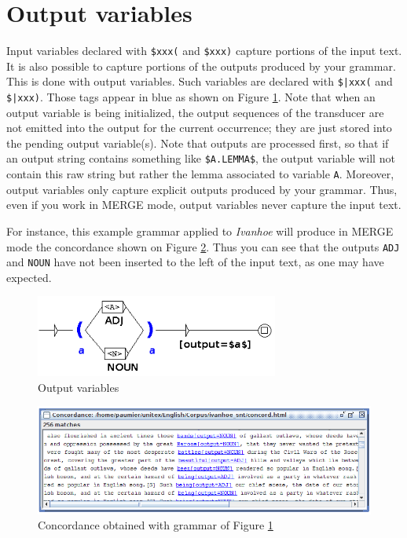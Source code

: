 \clearpage




\section{Output variables}
\label{section-output-variables}
Input variables declared with \verb+$xxx(+ and \verb+$xxx)+ capture portions of the input text. It
is also possible to capture portions of the outputs produced by your grammar. This is done with output variables.
Such variables are declared with \verb+$|xxx(+ and \verb+$|xxx)+. Those tags appear in blue as shown 
on Figure \ref{fig-output-variables}. Note that when an output variable is being initialized, the output sequences
of the transducer
are not emitted into the output for the current occurrence; they are just stored into the pending output variable(s).
Note that outputs are processed first, so that if an output string contains something like \verb+$A.LEMMA$+,
the output variable will not contain this raw string but rather the lemma associated to variable \verb+A+.
Moreover, output variables only capture explicit outputs produced by your grammar. Thus, even if you work
in MERGE mode, output variables never capture the input text. 

\noindent For instance, this example grammar applied to \textit{Ivanhoe} will produce in MERGE mode the concordance 
shown on Figure \ref{fig-output-variables-concord}. Thus you can see that the outputs \verb+ADJ+ and 
\verb+NOUN+ have not been inserted to the left of the input text, as one may have expected.

\begin{figure}[!ht]
\begin{center}
\includegraphics[width=8cm]{resources/img/fig6-17r.png}
\caption{Output variables\label{fig-output-variables}}
\end{center}
\end{figure}

\begin{figure}[!ht]
\begin{center}
\includegraphics[width=15cm]{resources/img/fig6-17s.png}
\caption{Concordance obtained with grammar of Figure \ref{fig-output-variables}\label{fig-output-variables-concord}}
\end{center}
\end{figure}


